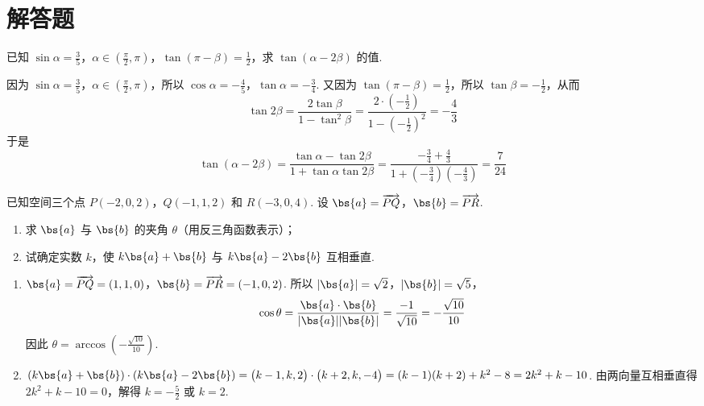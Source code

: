 \documentclass[UTF8,a4paper,oneside,11pt]{ctexbook}
\begin{document}
\section{解答题}

\begin{problem}
已知 \(\sin\alpha=\frac{3}{5}\)，\(\alpha\in\left(\frac{\pi}{2},\pi\right)\)，\(\tan(\pi-\beta)=\frac{1}{2}\)，求 \(\tan(\alpha-2\beta) \) 的值.
\end{problem}

\begin{solution}
因为 \(\sin \alpha = \frac{3}{5}\)，\(\alpha \in \left(\frac{\pi}{2}, \pi\right)\)，所以 \(\cos \alpha = -\frac{4}{5}\)，\(\tan \alpha = -\frac{3}{4}\).
又因为 \(\tan(\pi - \beta) = \frac{1}{2}\)，所以 \(\tan \beta = -\frac{1}{2}\)，从而
\[
\tan 2\beta=\frac{2\tan \beta}{1 - \tan^2 \beta}=\frac{2 \cdot \left(-\frac{1}{2}\right)}{1 - \left(-\frac{1}{2}\right)^2}=-\frac{4}{3}
\]
于是
\[
\tan(\alpha - 2\beta)=\frac{\tan \alpha - \tan 2\beta}{1 + \tan \alpha \tan 2\beta}=\frac{-\frac{3}{4} + \frac{4}{3}}{1 + \left(-\frac{3}{4}\right)\left(-\frac{4}{3}\right)}=\frac{7}{24}
\]
\end{solution}

\begin{problem}
已知空间三个点 \(P(-2,0,2)\)，\(Q(-1,1,2)\) 和 \(R(-3,0,4)\). 设 \(\bs{a} = \overrightarrow{PQ}\)，\(\bs{b} = \overrightarrow{PR}\).

\begin{enumerate}
\item 求 \(\bs{a} \) 与 \(\bs{b} \) 的夹角 \(\theta \)（用反三角函数表示）；
\item 试确定实数 \(k\)，使 \(k \bs{a} + \bs{b}\) 与 \(k \bs{a} - 2\bs{b}\) 互相垂直.
\end{enumerate}
\end{problem}

\begin{solution}
\begin{enumerate}
\item \(\bs{a} = \overrightarrow{PQ} = (1,1,0)\)，\(\bs{b} = \overrightarrow{PR} = (-1,0,2)\). 所以 \(\left|\bs{a}\right|=\sqrt{2}\)，\(\left|\bs{b}\right|=\sqrt{5}\)，
\[
\cos \theta=\frac{\bs{a}\cdot \bs{b}}{|\bs{a}||\bs{b}|}=\frac{-1}{\sqrt{10}}=-\frac{\sqrt{10}}{10}
\]
因此 \(\theta = \arccos\left(-\frac{\sqrt{10}}{10}\right)\).

\item \((k\bs{a}+\bs{b})\cdot(k\bs{a}-2\bs{b}) = \bigl(k-1,k,2\bigr)\cdot \bigl(k+2,k,-4\bigr) = (k-1)(k+2)+k^2-8 = 2k^2+k-10\). 由两向量互相垂直得 \(2k^2+k-10=0\)，解得 \(k=-\frac{5}{2}\) 或 \(k=2\).
\end{enumerate}
\end{solution}
\end{document}
